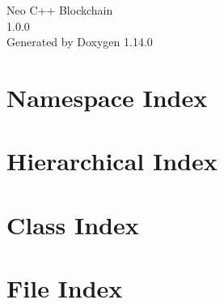 \documentclass[twoside]{book}
\newcommand{\+}{\discretionary{\mbox{\scriptsize$\hookleftarrow$}}{}{}}
\newcommand{\clearemptydoublepage}{%
    \newpage{\pagestyle{empty}\cleardoublepage}%
  }
\begin{document}
  \raggedbottom
    \hypersetup{pageanchor=false,
                bookmarksnumbered=true,
                pdfencoding=unicode
               }
  \begin{titlepage}
  \vspace*{7cm}
  \begin{center}%
  {\Large Neo C++ Blockchain}\\
  [1ex]\large 1.\+0.\+0 \\
  \vspace*{1cm}
  {\large Generated by Doxygen 1.14.0}\\
  \end{center}
  \end{titlepage}
  \clearemptydoublepage
  \tableofcontents
  \clearemptydoublepage
  \hypersetup{pageanchor=true}


\chapter{Namespace Index}

\chapter{Hierarchical Index}

\chapter{Class Index}

\chapter{File Index}

\end{document}
